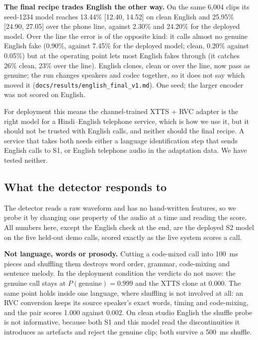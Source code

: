 \textbf{The final recipe trades English the other way.} On the same 6{,}004 clips its
seed-1234 model reaches 13.44\% {\scriptsize[12.40, 14.52]} on clean English and
25.95\% {\scriptsize[24.90, 27.05]} over the phone line, against 2.30\% and 24.20\% for
the deployed model. Over the line the error is of the opposite kind: it calls almost no
genuine English fake (0.90\%, against 7.45\% for the deployed model; clean, 0.20\% against
0.05\%) but at the operating point lets most English fakes through (it catches 26\% clean,
23\% over the line). English clones, clean or over the line, now pass as genuine; the run
changes speakers and codec together, so it does not say which moved it (\texttt{docs/results/english\_final\_v1.md}). One seed; the larger encoder was
not scored on English.

For deployment this means the channel-trained XTTS + RVC adapter is the right model
for a Hindi--English telephone service, which is how we use it, but it should not be
trusted with English calls, and neither should the final recipe. A service that takes
both needs either a language identification step that sends English calls to S1, or English
telephone audio in the adaptation data. We have tested neither.

\subsection{What the detector responds to}
\label{sec:probe}

The detector reads a raw waveform and has no hand-written features, so we probe it
by changing one property of the audio at a time and reading the score. All numbers
here, except the English check at the end, are the deployed S2 model on the five held-out
demo calls, scored exactly as the live system scores a call.

\textbf{Not language, words or prosody.} Cutting a code-mixed call into 100~ms
pieces and shuffling them destroys word order, grammar, code-mixing and sentence
melody. In the deployment condition the verdicts do not move: the genuine call
stays at $P(\text{genuine}) = 0.999$ and the XTTS clone at 0.000. The same point
holds inside one language, where shuffling is not involved at all: an RVC
conversion keeps its source speaker's exact words, timing and code-mixing, and the
pair scores 1.000 against 0.002. On clean studio English the shuffle probe is not
informative, because both S1 and this model read the discontinuities it introduces
as artefacts and reject the genuine clip; both survive a 500~ms shuffle.

